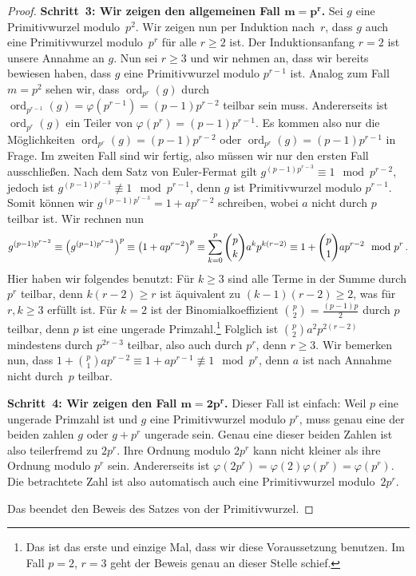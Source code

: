 \begin{proof}
	\textbf{Schritt~3: Wir zeigen den allgemeinen Fall $\boldsymbol{m=p^r}$.} Sei $g$ eine Primitivwurzel modulo~$p^2$. Wir zeigen nun per Induktion nach~$r$, dass $g$ auch eine Primitivwurzel modulo~$p^r$ für alle $r\geqslant 2$ ist. Der Induktionsanfang $r=2$ ist unsere Annahme an $g$. Nun sei $r\geqslant 3$ und wir nehmen an, dass wir bereits bewiesen haben, dass $g$ eine Primitivwurzel modulo $p^{r-1}$ ist. Analog zum Fall $m=p^2$ sehen wir, dass $\operatorname{ord}_{p^r}(g)$ durch $\operatorname{ord}_{p^{r-1}}(g)=\varphi(p^{r-1})=(p-1)p^{r-2}$ teilbar sein muss. Andererseits ist $\operatorname{ord}_{p^r}(g)$ ein Teiler von $\varphi(p^r)=(p-1)p^{r-1}$. Es kommen also nur die Möglichkeiten $\operatorname{ord}_{p^r}(g)=(p-1)p^{r-2}$ oder $\operatorname{ord}_{p^r}(g)=(p-1)p^{r-1}$ in Frage. Im zweiten Fall sind wir fertig, also müssen wir nur den ersten Fall ausschließen. Nach dem Satz von Euler-Fermat gilt $g^{(p-1)p^{r-3}}\equiv 1\mod p^{r-2}$, jedoch ist $g^{(p-1)p^{r-3}}\not\equiv1\mod p^{r-1}$, denn $g$ ist Primitivwurzel modulo $p^{r-1}$. Somit können wir $g^{(p-1)p^{r-3}}=1+ap^{r-2}$ schreiben, wobei $a$ nicht durch $p$ teilbar ist. Wir rechnen nun
	\begin{equation*}
		g^{(p-1)p^{r-2}}\equiv \parens*{g^{(p-1)p^{r-3}}}^p\equiv \parens*{1+ap^{r-2}}^{p}\equiv\sum_{k=0}^{p}\binom{p}{k}a^kp^{k(r-2)}\equiv 1+\binom{p}{1}ap^{r-2}\mod p^r\,.
	\end{equation*}
	Hier haben wir folgendes benutzt: Für $k\geqslant 3$ sind alle Terme in der Summe durch $p^r$ teilbar, denn $k(r-2)\geqslant r$ ist äquivalent zu $(k-1)(r-2)\geqslant 2$, was für $r,k\geqslant 3$ erfüllt ist. Für $k=2$ ist der Binomialkoeffizient $\binom{p}{2}=\frac{(p-1)p}{2}$ durch $p$ teilbar, denn $p$ ist eine ungerade Primzahl.\footnote{Das ist das erste und einzige Mal, dass wir diese Voraussetzung benutzen. Im Fall $p=2$, $r=3$ geht der Beweis genau an dieser Stelle schief.} Folglich ist $\binom{p}{2}a^2p^{2(r-2)}$ mindestens durch $p^{2r-3}$ teilbar, also auch durch $p^r$, denn $r\geqslant3$. Wir bemerken nun, dass $1+\binom{p}{1}ap^{r-2}\equiv 1+ap^{r-1}\not\equiv 1\mod p^r$, denn $a$ ist nach Annahme nicht durch~$p$ teilbar.
	
	\textbf{Schritt~4: Wir zeigen den Fall $\boldsymbol{m=2p^r}$.} Dieser Fall ist einfach: Weil $p$ eine ungerade Primzahl ist und $g$ eine Primitivwurzel modulo $p^r$, muss genau eine der beiden zahlen $g$ oder $g+p^r$ ungerade sein. Genau eine dieser beiden Zahlen ist also teilerfremd zu $2p^r$. Ihre Ordnung modulo $2p^r$ kann nicht kleiner als ihre Ordnung modulo $p^r$ sein. Andererseits ist  $\varphi(2p^r)=\varphi(2)\varphi(p^r)=\varphi(p^r)$. Die betrachtete Zahl ist also automatisch auch eine Primitivwurzel modulo~$2p^r$.
	
	Das beendet den Beweis des Satzes von der Primitivwurzel.
\end{proof}

